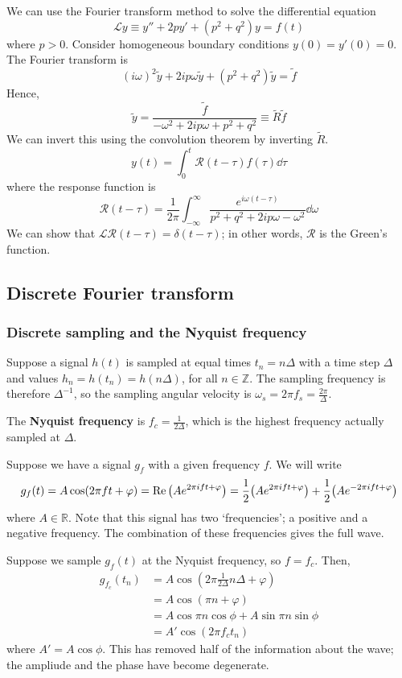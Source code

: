 \documentclass[a4paper]{article}
\begin{document}
\begin{example}
	We can use the Fourier transform method to solve the differential equation
\[
	\mathcal L y \equiv y'' + 2py' + (p^2 + q^2)y = f(t)
\]
where \( p > 0 \).
Consider homogeneous boundary conditions \( y(0) = y'(0) = 0 \).
The Fourier transform is
\[
	(i\omega)^2 \widetilde y + 2 i p \omega \widetilde y + (p^2 + q^2) \widetilde y = \widetilde f
\]
Hence,
\[
	\widetilde y = \frac{\widetilde f}{-\omega^2 + 2ip\omega + p^2 + q^2} \equiv \widetilde R \widetilde f
\]
We can invert this using the convolution theorem by inverting \( \widetilde R \).
\[
	y(t) = \int_0^t \mathcal R(t-\tau) f(\tau) \dd{\tau}
\]
where the response function is
\[
	\mathcal R(t - \tau) = \frac{1}{2\pi} \int_{-\infty}^\infty \frac{e^{i\omega(t-\tau)}}{p^2 + q^2 + 2ip\omega - \omega^2} \dd{\omega}
\]
We can show that \( \mathcal L \mathcal R(t-\tau) = \delta(t-\tau) \); in other words, \( \mathcal R \) is the Green's function.
\end{example}

\subsection{Discrete Fourier transform}
\subsubsection{Discrete sampling and the Nyquist frequency}
Suppose a signal \( h(t) \) is sampled at equal times \( t_n = n\Delta \) with a time step \( \Delta \) and values \( h_n = h(t_n) = h(n\Delta) \), for all \( n \in \mathbb Z \).
The sampling frequency is therefore \( \Delta^{-1} \), so the sampling angular velocity is \( \omega_s = 2\pi f_s = \frac{2\pi}{\Delta} \).
\begin{definition}
	The \textbf{Nyquist frequency} is \( f_c = \frac{1}{2\Delta} \), which is the highest frequency actually sampled at \( \Delta \).
\end{definition}
Suppose we have a signal \( g_f \) with a given frequency \( f \).
We will write
\[
	g_f(t) = A \cos(2\pi f t + \varphi) = \Re \qty(A e^{2 \pi i f t + \varphi}) = \frac{1}{2} \qty(A e^{2 \pi i f t + \varphi}) + \frac{1}{2} \qty(A e^{-2 \pi i f t + \varphi})
\]
where \( A \in \mathbb R \).
Note that this signal has two `frequencies'; a positive and a negative frequency.
The combination of these frequencies gives the full wave.

Suppose we sample \( g_f(t) \) at the Nyquist frequency, so \( f = f_c \).
Then,
\begin{align*}
	g_{f_c}(t_n) & = A \cos(2 \pi \frac{1}{2\Delta} n \Delta + \varphi) \\
	             & = A \cos(\pi n + \varphi)                            \\
	             & = A \cos \pi n \cos \phi + A \sin \pi n \sin \phi    \\
	             & = A' \cos(2\pi f_c t_n)
\end{align*}
where \( A' = A \cos \phi \).
This has removed half of the information about the wave; the ampliude and the phase have become degenerate.
\end{document}
